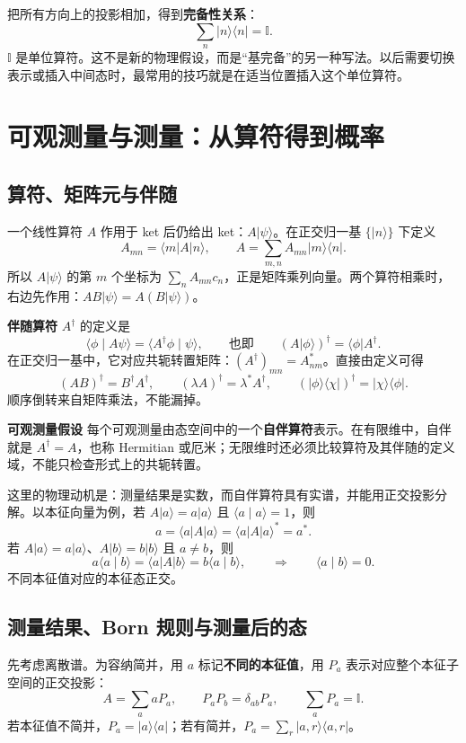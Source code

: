 \documentclass[a4paper,11pt]{article}
\numberwithin{equation}{section}
\newcommand{\I}{\mathbb I}
\newcommand{\ket}[1]{\lvert #1\rangle}
\newcommand{\bra}[1]{\langle #1\rvert}
\newcommand{\braket}[2]{\langle #1\mid #2\rangle}
\newcommand{\mel}[3]{\langle #1\rvert #2\lvert #3\rangle}
\newcommand{\important}[1]{\par\noindent\textbf{#1}\quad}
\begin{document}
把所有方向上的投影相加，得到\textbf{完备性关系}：
\begin{equation}\label{eq:resolution}
  \boxed{\sum_n\ket{n}\bra{n}=\I.}
\end{equation}
$\I$ 是单位算符。这不是新的物理假设，而是“基完备”的另一种写法。以后需要切换表示或插入中间态时，最常用的技巧就是在适当位置插入这个单位算符。

\section{可观测量与测量：从算符得到概率}
\subsection{算符、矩阵元与伴随}
一个线性算符 $A$ 作用于 ket 后仍给出 ket：$A\ket{\psi}$。在正交归一基 $\{\ket{n}\}$ 下定义
\begin{equation}
  A_{mn}=\mel{m}{A}{n},\qquad
  A=\sum_{m,n}A_{mn}\ket{m}\bra{n}.
\end{equation}
所以 $A\ket{\psi}$ 的第 $m$ 个坐标为 $\sum_n A_{mn}c_n$，正是矩阵乘列向量。两个算符相乘时，右边先作用：$AB\ket{\psi}=A(B\ket{\psi})$。

\textbf{伴随算符} $A^\dagger$ 的定义是
\begin{equation}\label{eq:adjoint}
  \braket{\phi}{A\psi}=\braket{A^\dagger\phi}{\psi},
  \qquad\text{也即}\qquad
  (A\ket{\phi})^\dagger=\bra{\phi}A^\dagger.
\end{equation}
在正交归一基中，它对应共轭转置矩阵：$(A^\dagger)_{mn}=A_{nm}^*$。直接由定义可得
\begin{equation}
  (AB)^\dagger=B^\dagger A^\dagger,\qquad
  (\lambda A)^\dagger=\lambda^*A^\dagger,
  \qquad (\ket{\phi}\bra{\chi})^\dagger=\ket{\chi}\bra{\phi}.
\end{equation}
顺序倒转来自矩阵乘法，不能漏掉。

\important{可观测量假设}
每个可观测量由态空间中的一个\textbf{自伴算符}表示。在有限维中，自伴就是 $A^\dagger=A$，也称 Hermitian 或厄米；无限维时还必须比较算符及其伴随的定义域，不能只检查形式上的共轭转置。

这里的物理动机是：测量结果是实数，而自伴算符具有实谱，并能用正交投影分解。以本征向量为例，若 $A\ket{a}=a\ket{a}$ 且 $\braket{a}{a}=1$，则
\[
  a=\mel{a}{A}{a}=\mel{a}{A}{a}^*=a^*.
\]
若 $A\ket{a}=a\ket{a}$、$A\ket{b}=b\ket{b}$ 且 $a\neq b$，则
\[
  a\braket{a}{b}=\mel{a}{A}{b}=b\braket{a}{b},
  \qquad\Rightarrow\qquad\braket{a}{b}=0.
\]
不同本征值对应的本征态正交。

\subsection{测量结果、Born 规则与测量后的态}
先考虑离散谱。为容纳简并，用 $a$ 标记\textbf{不同的本征值}，用 $P_a$ 表示对应整个本征子空间的正交投影：
\begin{equation}\label{eq:spectral}
  A=\sum_a aP_a,\qquad
  P_aP_b=\delta_{ab}P_a,\qquad \sum_aP_a=\I.
\end{equation}
若本征值不简并，$P_a=\ket{a}\bra{a}$；若有简并，$P_a=\sum_r\ket{a,r}\bra{a,r}$。
\end{document}
